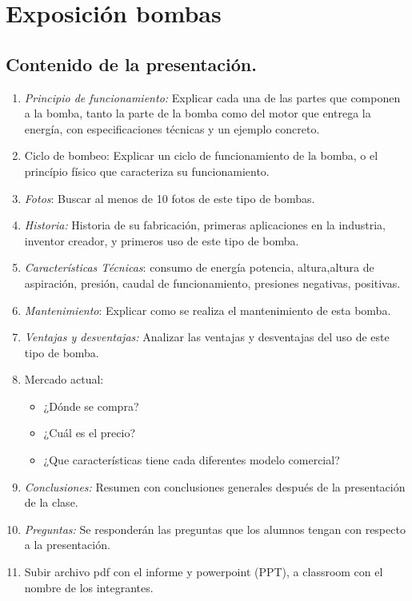 \documentclass[../main]{subfiles}
\begin{document}
\chapter{Exposición bombas}


\section{Contenido de la presentación.}
\begin{enumerate}
  \item \emph{Principio de funcionamiento:} Explicar cada una de las
    partes que componen a la bomba, tanto la parte de la bomba como
    del motor que entrega la energía, con especificaciones técnicas y
    un ejemplo concreto.
  \item Ciclo de bombeo: Explicar un ciclo de funcionamiento de la
    bomba, o el princípio físico que caracteriza su funcionamiento.
  \item \emph{Fotos}: Buscar al menos de 10 fotos de este tipo de bombas.
  \item \emph{Historia:} Historia de su fabricación, primeras
    aplicaciones en la industria, inventor creador, y primeros uso de
    este tipo de bomba.
  \item \emph{Características Técnicas}: consumo de energía potencia,
    altura,altura de aspiración, presión, caudal de funcionamiento,
    presiones negativas, positivas.
  \item \emph{Mantenimiento}: Explicar como se realiza el
    mantenimiento de esta bomba.
  \item \emph{Ventajas y desventajas:} Analizar las ventajas y
    desventajas del uso de este tipo de bomba.
  \item Mercado actual:
    \begin{itemize}
      \item ¿Dónde se compra?
      \item ¿Cuál es el precio?
      \item ¿Que características tiene cada diferentes  modelo comercial?
    \end{itemize}
  \item \emph{Conclusiones:} Resumen con conclusiones generales
    después de la presentación de la clase.
  \item \emph{Preguntas:} Se responderán las preguntas que los
    alumnos tengan con respecto a la presentación.
  \item Subir archivo pdf con el informe y powerpoint (PPT), a
    classroom con el nombre de los integrantes.
\end{enumerate}
\end{document}
